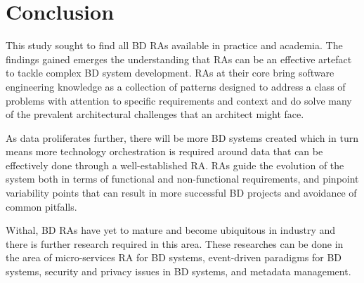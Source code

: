 \documentclass{ieeeaccess}
\begin{document}
\section{Conclusion}

This study sought to find all BD RAs available in practice and academia. The findings gained emerges the understanding that RAs can be an effective artefact to tackle complex BD system development. RAs at their core bring software engineering knowledge as a collection of patterns designed to address a class of problems with attention to specific requirements and context and do solve many of the prevalent architectural challenges that an architect might face. 

As data proliferates further, there will be more BD systems created which in turn means more technology orchestration is required around data that can be effectively done through a well-established RA. RAs guide the evolution of the system both in terms of functional and non-functional requirements, and pinpoint variability points that can result in more successful BD projects and avoidance of common pitfalls. 

Withal, BD RAs have yet to mature and become ubiquitous in industry and there is further research required in this area. These researches can be done in the area of micro-services RA for BD systems, event-driven paradigms for BD systems, security and privacy issues in BD systems, and metadata management.



\end{document}
